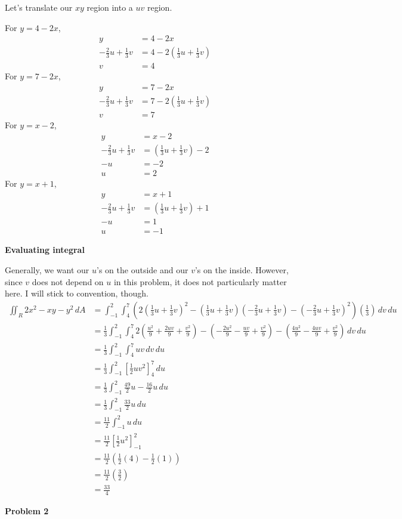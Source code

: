 \documentclass{article}
\newcommand{\lrp}[1]{\left( #1 \right)}
\newcommand{\lrb}[1]{\left[ #1 \right]}
\begin{document}
Let's translate our $xy$ region into a $uv$ region.

For $y=4-2x$,
\begin{align*}
    y&=4-2x\\
    -\frac{2}{3}u+\frac{1}{3}v&=4-2\lrp{\frac{1}{3}u+\frac{1}{3}v}\\
    v&=4
\end{align*}
For $y=7-2x$,
\begin{align*}
    y&=7-2x\\
-\frac{2}{3}u+\frac{1}{3}v&=7-2\lrp{\frac{1}{3}u+\frac{1}{3}v}\\
v&=7
\end{align*}
For $y=x-2$,
\begin{align*}
    y&=x-2\\
    -\frac{2}{3}u+\frac{1}{3}v&=\lrp{\frac{1}{3}u+\frac{1}{3}v}-2\\
    -u&=-2\\
    u&=2
\end{align*}
For $y=x+1$,
\begin{align*}
    y&=x+1\\
   -\frac{2}{3}u+\frac{1}{3}v&=\lrp{\frac{1}{3}u+\frac{1}{3}v}+1\\
   -u&=1\\
   u&=-1
\end{align*}
{}\textbf{Evaluating integral}

Generally, we want our $u$'s on the outside and our $v$'s on the inside. However, since $v$ does not depend on $u$ in this problem, it does not particularly matter here. I will stick to convention, though.
\begin{align*}
    \iint_R 2x^2-xy-y^2\,dA&=\int_{-1}^2\int_4^7 \lrp{2\lrp{\frac{1}{3}u+\frac{1}{3}v}^2-\lrp{\frac{1}{3}u+\frac{1}{3}v}\lrp{-\frac{2}{3}u+\frac{1}{3}v}-\lrp{-\frac{2}{3}u+\frac{1}{3}v}^2}\lrp{\frac{1}{3}}\,dv\,du\\
    &=\frac{1}{3}\int_{-1}^2\int_4^7 2\lrp{\frac{u^2}{9}+\frac{2uv}{9}+\frac{v^2}{9}}-\lrp{-\frac{2u^2}{9}-\frac{uv}{9}+\frac{v^2}{9}}-\lrp{\frac{4u^2}{9}-\frac{4uv}{9}+\frac{v^2}{9}}\,dv\,du\\
    &=\frac{1}{3}\int_{-1}^2\int_4^7 uv \,dv\,du\tag{lots of simplifying}\\
    &=\frac{1}{3}\int_{-1}^{2}\lrb{\frac{1}{2}uv^2}_4^7\,du\\
    &=\frac{1}{3}\int_{-1}^2 \frac{49}{2}u-\frac{16}{2}u\,du\\
    &=\frac{1}{3}\int_{-1}^2 \frac{33}{2}u\,du\\
    &=\frac{11}{2}\int_{-1}^2 u\,du\\
    &=\frac{11}{2}\lrb{\frac{1}{2}u^2}_{-1}^2\\
    &=\frac{11}{2}\lrp{\frac{1}{2}(4)-\frac{1}{2}(1)}\\
    &=\frac{11}{2}\lrp{\frac{3}{2}}\\
    &=\boxed{\frac{33}{4}}
\end{align*}
{}\textbf{Problem 2}
\end{document}
